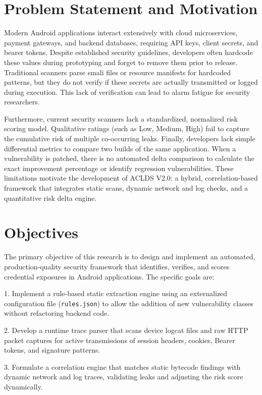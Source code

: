 \documentclass[conference]{
IEEEtran}
\begin{document}
\section{Problem Statement and Motivation}
Modern Android applications interact extensively with cloud microservices, payment gateways, and backend databases, requiring API keys, client secrets, and bearer tokens. Despite established security guidelines, developers often hardcode these values during prototyping and forget to remove them prior to release. Traditional scanners parse smali files or resource manifests for hardcoded patterns, but they do not verify if these secrets are actually transmitted or logged during execution. This lack of verification can lead to alarm fatigue for security researchers.

Furthermore, current security scanners lack a standardized, normalized risk scoring model. Qualitative ratings (such as Low, Medium, High) fail to capture the cumulative risk of multiple co-occurring leaks. Finally, developers lack simple differential metrics to compare two builds of the same application. When a vulnerability is patched, there is no automated delta comparison to calculate the exact improvement percentage or identify regression vulnerabilities. These limitations motivate the development of ACLDS V2.0: a hybrid, correlation-based framework that integrates static scans, dynamic network and log checks, and a quantitative risk delta engine.

\section{Objectives}
The primary objective of this research is to design and implement an automated, production-quality security framework that identifies, verifies, and scores credential exposures in Android applications. The specific goals are:

1. Implement a rule-based static extraction engine using an externalized configuration file (\texttt{rules.json}) to allow the addition of new vulnerability classes without refactoring backend code.

2. Develop a runtime trace parser that scans device logcat files and raw HTTP packet captures for active transmissions of session headers, cookies, Bearer tokens, and signature patterns.

3. Formulate a correlation engine that matches static bytecode findings with dynamic network and log traces, validating leaks and adjusting the risk score dynamically.
\end{document}
